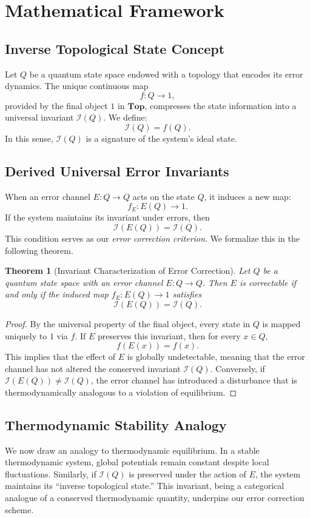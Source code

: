 \documentclass[11pt]{article}
\newtheorem{theorem}{Theorem}[section]
\begin{document}
\section{Mathematical Framework}
\label{sec:framework}

\subsection{Inverse Topological State Concept}
Let \(Q\) be a quantum state space endowed with a topology that encodes its error dynamics. The unique continuous map 
\[
f: Q \to 1,
\]
provided by the final object \(1\) in \(\mathbf{Top}\), compresses the state information into a universal invariant \(\mathcal{I}(Q)\). We define:
\[
\mathcal{I}(Q) = f(Q).
\]
In this sense, \(\mathcal{I}(Q)\) is a signature of the system’s ideal state.

\subsection{Derived Universal Error Invariants}
When an error channel \(E: Q \to Q\) acts on the state \(Q\), it induces a new map:
\[
f_E: E(Q) \to 1.
\]
If the system maintains its invariant under errors, then
\[
\mathcal{I}(E(Q)) = \mathcal{I}(Q).
\]
This condition serves as our \emph{error correction criterion}. We formalize this in the following theorem.

\begin{theorem}[Invariant Characterization of Error Correction]
Let \(Q\) be a quantum state space with an error channel \(E: Q \to Q\). Then \(E\) is correctable if and only if the induced map \(f_E: E(Q) \to 1\) satisfies
\[
\mathcal{I}(E(Q)) = \mathcal{I}(Q).
\]
\end{theorem}

\begin{proof}
By the universal property of the final object, every state in \(Q\) is mapped uniquely to \(1\) via \(f\). If \(E\) preserves this invariant, then for every \(x\in Q\),
\[
f(E(x)) = f(x).
\]
This implies that the effect of \(E\) is globally undetectable, meaning that the error channel has not altered the conserved invariant \(\mathcal{I}(Q)\). Conversely, if \(\mathcal{I}(E(Q)) \neq \mathcal{I}(Q)\), the error channel has introduced a disturbance that is thermodynamically analogous to a violation of equilibrium.
\end{proof}

\subsection{Thermodynamic Stability Analogy}
We now draw an analogy to thermodynamic equilibrium. In a stable thermodynamic system, global potentials remain constant despite local fluctuations. Similarly, if \( \mathcal{I}(Q)\) is preserved under the action of \(E\), the system maintains its “inverse topological state.” This invariant, being a categorical analogue of a conserved thermodynamic quantity, underpins our error correction scheme.
\end{document}
